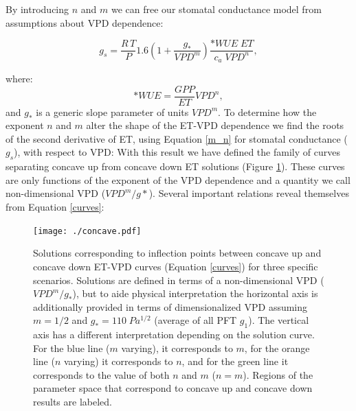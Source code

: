 \documentclass[draft,linenumbers]{afmjournal}
\begin{document}
By introducing $n$ and $m$ we can free our stomatal
conductance model from assumptions about VPD dependence:
\begin{linenomath*}
  \begin{equation}
    g_s = \frac{R \, T}{P} 1.6 \left(1 + \frac{g_*}{VPD^m}\right) \frac{*WUE \; ET}{c_a \; VPD^n},
    \label{m_n}
  \end{equation}
\end{linenomath*}
where:
\[*WUE = \frac{GPP}{ET}VPD^n,\] and $g_*$ is a generic slope parameter
of units $VPD^m$. To determine how the exponent $n$ and $m$ alter the
shape of the ET-VPD dependence we find the roots of the second
derivative of ET, using Equation \ref{m_n} for stomatal conductance
($g_s$), with respect to VPD:  With this
result we have defined the family of curves separating concave up from
concave down ET solutions (Figure \ref{concave}). These curves are
only functions of the exponent of the VPD dependence and a quantity we
call non-dimensional VPD ($VPD^m/g*$). Several important
relations reveal themselves from Equation \ref{curves}:

\begin{figure}
  \centering
  \centerline{\texttt{[image: ./concave.pdf]}}
  \caption{ Solutions corresponding to inflection points between
    concave up and concave down ET-VPD curves (Equation \ref{curves})
    for three specific scenarios. Solutions are defined in terms of a
    non-dimensional VPD ($VPD^m/g_*$), but to aide physical
    interpretation the horizontal axis is additionally provided in terms of dimensionalized VPD assuming $m=1/2$ and
    $g_*=110\; Pa^{1/2}$ (average of all PFT $g_1$). The vertical axis
    has a different interpretation depending on the solution
    curve. For the blue line ($m$ varying), it corresponds to $m$,
    for the orange line ($n$ varying) it corresponds to $n$, and for
    the green line it corresponds to the value of both $n$ and $m$
    ($n=m$). Regions of the parameter space that correspond to
    concave up and concave down results are labeled.}
  \label{concave}
\end{figure}
\end{document}
